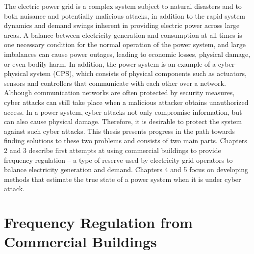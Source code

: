 \documentclass[../thesis.tex]{subfiles}
\begin{document}
The electric power grid is a complex system subject to natural disasters and to both nuisance and potentially malicious attacks, in addition to the rapid system dynamics and demand swings inherent in providing electric power across large areas.
A balance between electricity generation and consumption at all times is one necessary condition for the normal operation of the power system, and large imbalances can cause power outages, leading to economic losses, physical damage, or even bodily harm.
In addition, the power system is an example of a cyber-physical system (CPS), which consists of physical components such as actuators, sensors and controllers that communicate with each other over a network. 
Although communication networks are often protected by security measures, cyber attacks can still take place when a malicious attacker obtains unauthorized access. %
In a power system, cyber attacks not only compromise information, but can also cause physical damage. 
Therefore, it is desirable to protect the system against such cyber attacks.
This thesis presents progress in the path towards finding solutions to these two problems and consists of two main parts.
Chapters 2 and 3 describe first attempts at using commercial buildings to provide frequency regulation -- a type of reserve used by electricity grid operators to balance electricity generation and demand. 
Chapters 4 and 5 focus on developing methods that estimate the true state of a power system when it is under cyber attack.




\section{Frequency Regulation from Commercial Buildings}
\end{document}
